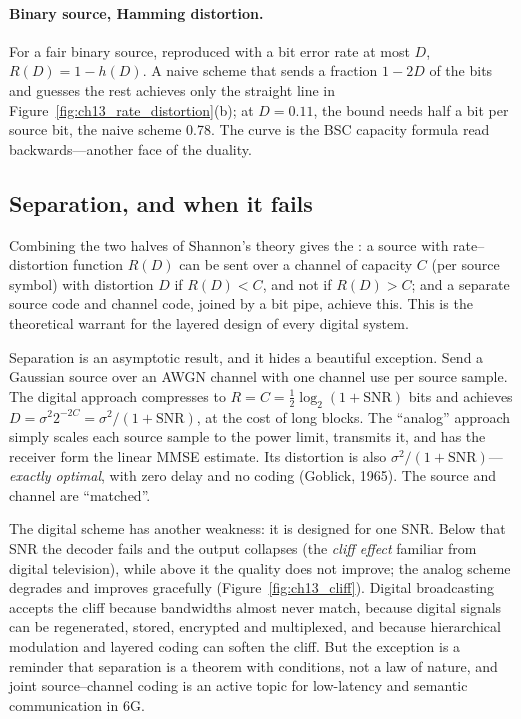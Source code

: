 \paragraph{Binary source, Hamming distortion.} For a fair binary source, reproduced with a bit
error rate at most $D$, $R(D)=1-h(D)$. A naive scheme that sends a fraction $1-2D$ of the bits and
guesses the rest achieves only the straight line in Figure~\ref{fig:ch13_rate_distortion}(b); at
$D=0.11$, the bound needs half a bit per source bit, the naive scheme 0.78. The curve is the BSC
capacity formula read backwards---another face of the duality.

\subsection{Separation, and when it fails}

Combining the two halves of Shannon's theory gives the : a
source with rate--distortion function $R(D)$ can be sent over a channel of capacity $C$ (per source
symbol) with distortion $D$ if $R(D)<C$, and not if $R(D)>C$; and a separate source code and channel
code, joined by a bit pipe, achieve this. This is the theoretical warrant for the layered design of
every digital system.

Separation is an asymptotic result, and it hides a beautiful exception. Send a Gaussian source over
an AWGN channel with one channel use per source sample. The digital approach compresses to
$R=C=\frac12\log_2(1+\mathrm{SNR})$ bits and achieves $D=\sigma^2 2^{-2C}=\sigma^2/(1+\mathrm{SNR})$,
at the cost of long blocks. The ``analog'' approach simply scales each source sample to the power
limit, transmits it, and has the receiver form the linear MMSE estimate. Its distortion is also
$\sigma^2/(1+\mathrm{SNR})$---\emph{exactly optimal}, with zero delay and no coding (Goblick,
1965). The source and channel are ``matched''.


The digital scheme has another weakness: it is designed for one SNR. Below that SNR the decoder
fails and the output collapses (the \emph{cliff effect} familiar from digital television), while
above it the quality does not improve; the analog scheme degrades and improves gracefully
(Figure~\ref{fig:ch13_cliff}). Digital broadcasting accepts the cliff because bandwidths almost
never match, because digital signals can be regenerated, stored, encrypted and multiplexed, and
because hierarchical modulation and layered coding can soften the cliff. But the exception is a
reminder that separation is a theorem with conditions, not a law of nature, and joint
source--channel coding is an active topic for low-latency and semantic communication in 6G.

